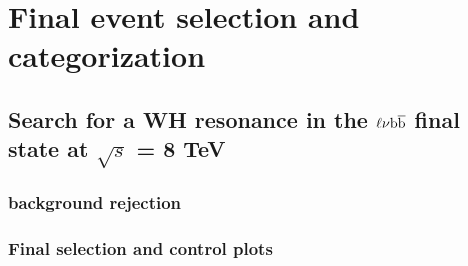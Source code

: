 \chapter{Final event selection and categorization}

\section{Search for a WH resonance in the $\ell\nu{\mathrm{b}\overline{\mathrm{b}}}$ final state at $\sqrt{s}$ = 8 TeV}

\subsection{\ttbar background rejection}

\subsection{Final selection and control plots}

